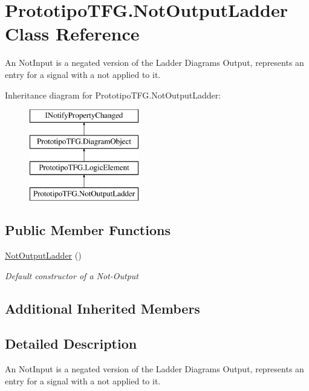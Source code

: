 \hypertarget{class_prototipo_t_f_g_1_1_not_output_ladder}{}\section{Prototipo\+T\+F\+G.\+Not\+Output\+Ladder Class Reference}
\label{class_prototipo_t_f_g_1_1_not_output_ladder}


An Not\+Input is a negated version of the Ladder Diagram\textquotesingle{}s Output, represents an entry for a signal with a \textquotesingle{}not\textquotesingle{} applied to it.  


Inheritance diagram for Prototipo\+T\+F\+G.\+Not\+Output\+Ladder\+:\begin{figure}[H]
\begin{center}
\leavevmode
\includegraphics[height=4.000000cm]{class_prototipo_t_f_g_1_1_not_output_ladder}
\end{center}
\end{figure}
\subsection*{Public Member Functions}
\begin{DoxyCompactItemize}
\item 
\hyperlink{class_prototipo_t_f_g_1_1_not_output_ladder_aa0cb2f4a54d43459359f4869c19f12fe}{Not\+Output\+Ladder} ()
\begin{DoxyCompactList}\small\item\em Default constructor of a Not-\/\+Output \end{DoxyCompactList}\end{DoxyCompactItemize}
\subsection*{Additional Inherited Members}


\subsection{Detailed Description}
An Not\+Input is a negated version of the Ladder Diagram\textquotesingle{}s Output, represents an entry for a signal with a \textquotesingle{}not\textquotesingle{} applied to it. 



